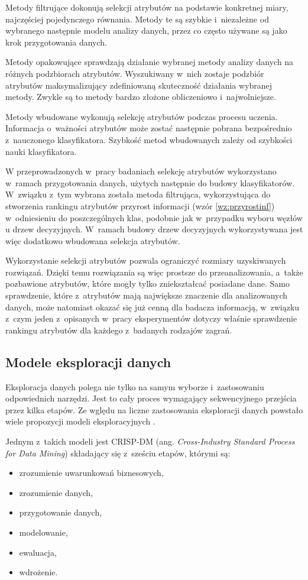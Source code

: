 \documentclass[a4paper,twoside,12pt]{book}
\newcommand{\obcy}[1]{\emph{#1}}
\renewcommand{\ang}[1]{{\selectlanguage{british}\obcy{#1}}}
\begin{document}
Metody filtrujące dokonują selekcji atrybutów na podstawie konkretnej miary, najczęściej pojedynczego równania. Metody te są szybkie i~niezależne od wybranego następnie modelu analizy danych, przez co często używane są jako krok przygotowania danych.

Metody opakowujące sprawdzają działanie wybranej metody analizy danych na różnych podzbiorach atrybutów. Wyszukiwany w~nich zostaje podzbiór atrybutów maksymalizujący zdefiniowaną skuteczność działania wybranej metody. Zwykle są to metody bardzo złożone obliczeniowo i~najwolniejsze. 

Metody wbudowane wykonują selekcję atrybutów podczas procesu uczenia. Informacja o~ważności atrybutów może zostać następnie pobrana bezpośrednio z~nauczonego klasyfikatora. Szybkość metod wbudowanych zależy od szybkości nauki klasyfikatora.

W przeprowadzonych w~pracy badaniach selekcję atrybutów wykorzystano w~ramach przygotowania danych, użytych następnie do budowy klasyfikatorów. W~związku z~tym wybrana została metoda filtrująca, wykorzystująca do stworzenia rankingu atrybutów przyrost informacji (wzór \ref{wz:przyrostinf}) w~odniesieniu do poszczególnych klas, podobnie jak w~przypadku wyboru węzłów u drzew decyzyjnych. W~ramach budowy drzew decyzyjnych wykorzystywana jest więc dodatkowo wbudowana selekcja atrybutów. 

Wykorzystanie selekcji atrybutów pozwala ograniczyć rozmiary uzyskiwanych rozwiązań. Dzięki temu rozwiązania są więc prostsze do przeanalizowania, a~także pozbawione atrybutów, które mogły tylko zniekształcać posiadane dane. Samo sprawdzenie, które z~atrybutów mają największe znaczenie dla analizowanych danych, może natomiast okazać się już cenną dla badacza informacją, w~związku z~czym jeden z~opisanych w~pracy eksperymentów dotyczy właśnie sprawdzenie rankingu atrybutów dla każdego z~badanych rodzajów zagrań.   

\subsection{Modele eksploracji danych}
Eksploracja danych polega nie tylko na samym wyborze i~zastosowaniu odpowiednich narzędzi. Jest to cały proces wymagający sekwencyjnego przejścia przez kilka etapów. Ze wględu na liczne zastosowania  eksploracji danych powstało wiele propozycji modeli eksploracyjnych \cite{bib:analizaModeliEksploracji}. 

Jednym z~takich modeli jest CRISP-DM (ang. \ang{Cross-Industry Standard Process for Data Mining}) \cite{bib:crispdm} składający się z~sześciu etapów, którymi są:
\begin{itemize}
\item zrozumienie uwarunkowań biznesowych,
\item zrozumienie danych,
\item przygotowanie danych,
\item modelowanie,
\item ewaluacja,
\item wdrożenie.
\end{itemize}
\end{document}
